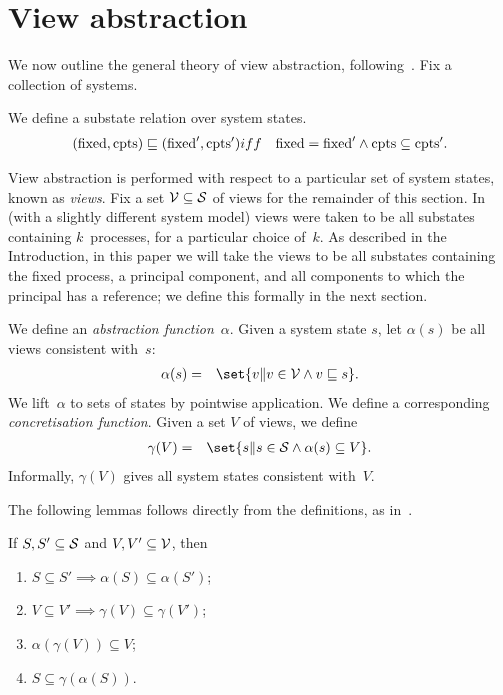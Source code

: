 \section{View abstraction}
\label{sec:view-abstraction}

We now outline the general theory of view abstraction, following~\cite{AHH}.
Fix a collection of systems. 

We define a substate relation over system states.
\begin{eqnarray*}
(\fixed, \cpt ) \sqle (\fixed', \cpt') & iff & 
  \fixed = \fixed' \land \cpt \subseteq \cpt' .
\end{eqnarray*}


View abstraction is performed with respect to a particular set of 
system states, known as \emph{views}.  Fix a set $\V \subseteq \S$ of views
for the remainder of this section.  In~\cite{AHH} (with a slightly different
system model) views were taken to be all substates containing $k$~processes,
for a particular choice of~$k$.  As described in the Introduction, in this
paper we will take the views to be all substates containing the fixed process,
a principal component, and all components to which the principal has a
reference; we define this formally in the next section.

We define an \emph{abstraction function}~$\alpha$.  Given a system state $s$,
let $\alpha(s)$ be all views consistent with~$s$:
%
\begin{eqnarray*}
\alpha(s) & = &
  \set{ v \| v \in \V \land v \sqle s}.
\end{eqnarray*}
%
We lift~$\alpha$ to sets of states by pointwise application. 
%
We define a corresponding \emph{concretisation function}.
Given a set $V$ of views, we define
%
\begin{eqnarray*}
\gamma(V) & = &   \set{ s \| s \in \S \land \alpha(s) \subseteq V }.
\end{eqnarray*}
%
Informally, $\gamma(V)$ gives all system states consistent with~$V$. 

The following lemmas follows directly from the definitions, as in~\cite{AHH}.
% 
\begin{lemma}
If $S, S' \subseteq \S$ and $V, V' \subseteq \V$, then
\begin{enumerate}
\item $S \subseteq S' \implies \alpha(S) \subseteq \alpha(S')$;

\item $V \subseteq V' \implies \gamma(V) \subseteq \gamma(V')$;

\item $\alpha(\gamma(V)) \subseteq V$;

\item $S \subseteq \gamma(\alpha(S))$.
\end{enumerate}
\end{lemma}
%

